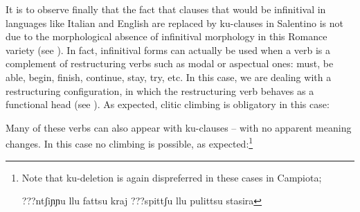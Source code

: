 \documentclass[output=paper]{langscibook}
\begin{document}
\ea \label{ac19}
    \z
\z
    
It is to observe finally that the fact that clauses that would be infinitival in languages like Italian and English are replaced by ku-clauses in Salentino is not due to the morphological absence of infinitival morphology in this Romance variety (see \cite{calabrese1993a}). In fact, infinitival forms can actually be used when a verb is a complement of restructuring verbs such as modal or aspectual ones: must, be able, begin, finish, continue, stay, try, etc. In this case, we are dealing with a restructuring configuration, in which the restructuring verb behaves as a functional head (see \cite{rizzi1976a, rizzi1978a, cinque2001a, cinque2006a, wurmbrand2001a,wurmbrand2004a,wurmbrand2015,wurmbrand2017verb}).  As expected, clitic climbing is obligatory in this case:

\ea \label{ac20}
    \z
\z

Many of these verbs can also appear with ku-clauses -- with no apparent meaning changes. In this case no climbing is possible, as expected:\footnote{Note that ku-deletion is again dispreferred in these cases in Campiota;

\ea \label{fn10ex}
    \ea \label{fn10exa}???ntʃiɲɲu llu fattsu kraj  
    \ex \label{fn10exb}???spittʃu llu pulittsu stasira
    \z
\z

} 
\end{document}
